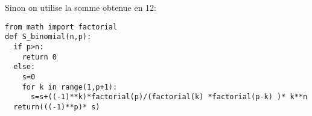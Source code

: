 \begin{correction}
\begin{enumerate}
\begin{enumerate}
\begin{lstlisting}
\end{lstlisting}

Sinon on utilise la somme obtenue en 12: 
\begin{lstlisting}
from math import factorial
def S_binomial(n,p):
  if p>n:
    return 0
  else: 
    s=0
    for k in range(1,p+1):
      s=s+((-1)**k)*factorial(p)/(factorial(k) *factorial(p-k) )* k**n
  return(((-1)**p)* s)
\end{lstlisting}
\end{enumerate}
\end{enumerate}
\end{correction}




